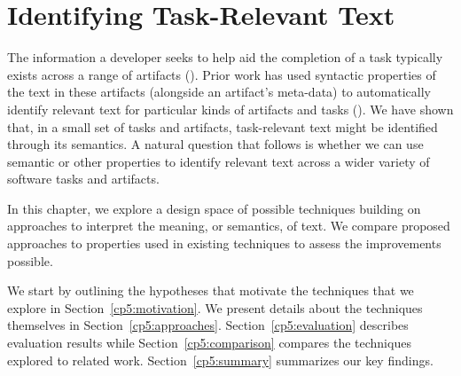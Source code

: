 \setcounter{chapter}{4}
\setcounter{rq}{1}


\chapter{Identifying Task-Relevant Text}
\label{ch:identifying}

The information a developer seeks to help aid the completion of a task typically exists
across a range of artifacts (). Prior work has used syntactic properties of the text
in these artifacts (alongside an artifact's meta-data)
to automatically identify relevant text for particular kinds of artifacts and tasks ().
We have  shown that, in a small set of tasks and artifacts, task-relevant text might be identified through its semantics.
A natural question that follows is whether we can use semantic or other properties to identify relevant text across a wider variety of software tasks and artifacts.

In this chapter, we explore a design space of possible techniques building on approaches to
interpret the meaning, or semantics, of text. We compare proposed approaches to properties
used in existing techniques to assess the improvements possible. 

We start by outlining the hypotheses that motivate the techniques that we explore in Section~\ref{cp5:motivation}.
We present details about the techniques themselves in Section~\ref{cp5:approaches}.
Section~\ref{cp5:evaluation} describes evaluation results while
Section~\ref{cp5:comparison} compares the techniques explored to related work.
Section~\ref{cp5:summary} summarizes our key findings.

\clearpage
















